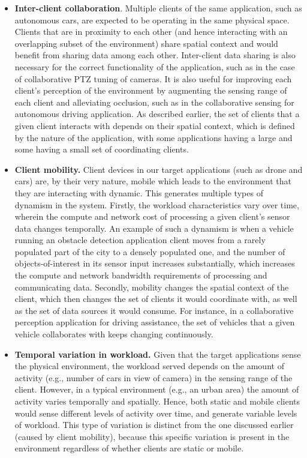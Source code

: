 \begin{itemize}
\item \textbf{Inter-client collaboration}. Multiple clients of the same application, such as autonomous cars, are expected to be operating in the same physical space. Clients that are in proximity to each other (and hence interacting with an overlapping subset of the environment) share spatial context and would benefit from sharing data among each other. Inter-client data sharing is also necessary for the correct functionality of the application, such as in the case of collaborative PTZ tuning of cameras. It is also useful for improving each client's perception of the environment by augmenting the sensing range of each client and alleviating occlusion, such as in the collaborative sensing for autonomous driving application. As described earlier, the set of clients that a given client interacts with depends on their spatial context, which is defined by the nature of the application, with some applications having a large and some having a small set of coordinating clients.

\item \textbf{Client mobility.} Client devices in our target applications (such as drone and cars) are, by their very nature, mobile which leads to the environment that they are interacting with dynamic. This generates multiple types of dynamism in the system. Firstly, the workload characteristics vary over time, wherein the compute and network cost of processing a given client's sensor data changes temporally. An example of such a dynamism is when a vehicle running an obstacle detection application client moves from a rarely populated part of the city to a densely populated one, and the number of objects-of-interest in its sensor input increases substantially, which increases the compute and network bandwidth requirements of processing and communicating data. Secondly, mobility changes the spatial context of the client, which then changes the set of clients it would coordinate with, as well as the set of data sources it would consume. For instance, in a collaborative perception application for driving assistance, the set of vehicles that a given vehicle collaborates with keeps changing continuously.

\item \textbf{Temporal variation in workload.} Given that the target applications sense the physical environment, the workload served depends on the amount of activity (e.g., number of cars in view of camera) in the sensing range of the client. However, in a typical environment (e.g., an urban area) the amount of activity varies temporally and spatially. Hence, both static and mobile clients would sense different levels of activity over time, and generate variable levels of workload. This type of variation is distinct from the one discussed earlier (caused by client mobility), because this specific variation is present in the environment regardless of whether clients are static or mobile.
\end{itemize}

